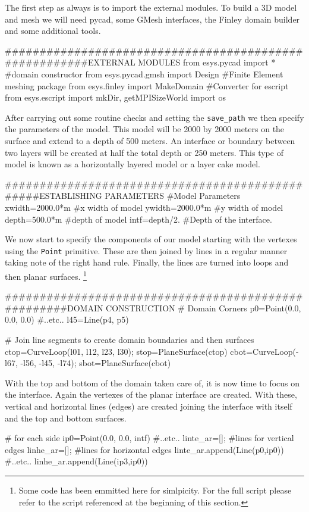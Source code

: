 The first step as always is to import the external modules. To build a 3D model
and mesh we will need pycad, some GMesh interfaces, the Finley domain builder
and some additional tools.
\begin{python}
#######################################################EXTERNAL MODULES
from esys.pycad import * #domain constructor
from esys.pycad.gmsh import Design #Finite Element meshing package
from esys.finley import MakeDomain #Converter for escript
from esys.escript import mkDir, getMPISizeWorld
import os
\end{python}
After carrying out some routine checks and setting the \verb!save_path! we then
specify the parameters of the model. This model will be 2000 by 2000 meters on
the surface and extend to a depth of 500 meters. An interface or boundary
between two layers will be created at half the total depth or 250 meters. This
type of model is known as a horizontally layered model or a layer cake model. 
\begin{python}
################################################ESTABLISHING PARAMETERS
#Model Parameters
xwidth=2000.0*m   #x width of model
ywidth=2000.0*m   #y width of model
depth=500.0*m   #depth of model
intf=depth/2.   #Depth of the interface.
\end{python}
We now start to specify the components of our model starting with the vertexes
using the \verb!Point! primitive. These are then joined by lines in a regular
manner taking note of the right hand rule. Finally, the lines are turned into
loops and then planar surfaces.
\footnote{Some code has been emmitted here for
simlpicity. For the full script please refer to the script referenced at the beginning of
this section.}
\begin{python}
####################################################DOMAIN CONSTRUCTION
# Domain Corners
p0=Point(0.0,    0.0,      0.0)
#..etc..
l45=Line(p4, p5)

# Join line segments to create domain boundaries and then surfaces
ctop=CurveLoop(l01, l12, l23, l30);     stop=PlaneSurface(ctop)
cbot=CurveLoop(-l67, -l56, -l45, -l74); sbot=PlaneSurface(cbot)
\end{python}
With the top and bottom of the domain taken care of, it is now time to focus on
the interface. Again the vertexes of the planar interface are created. With
these, vertical and horizontal lines (edges) are created joining the interface
with itself and the top and bottom surfaces. 
\begin{python}
# for each side
ip0=Point(0.0,    0.0,      intf)
#..etc..
linte_ar=[]; #lines for vertical edges
linhe_ar=[]; #lines for horizontal edges
linte_ar.append(Line(p0,ip0))
#..etc..
linhe_ar.append(Line(ip3,ip0))
\end{python}
